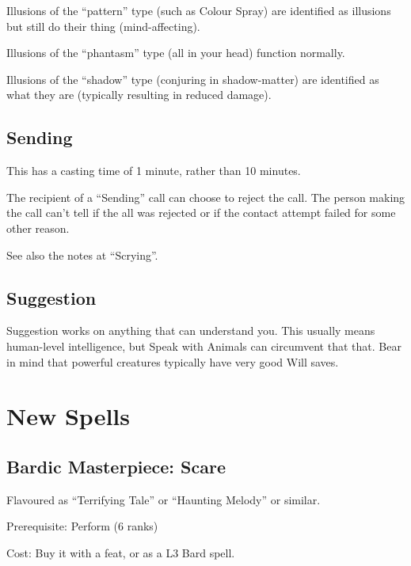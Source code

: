 Illusions of the ``pattern'' type (such as Colour Spray) are identified as
illusions but still do their thing (mind-affecting).

Illusions of the ``phantasm'' type (all in your head) function normally.

Illusions of the ``shadow'' type (conjuring in shadow-matter) are
identified as what they are (typically resulting in reduced damage).
%

%
\subsection{Sending}

This has a casting time of 1 minute, rather than 10 minutes.

The recipient of a ``Sending'' call can choose to reject the call. The
person making the call can't tell if the all was rejected or if the
contact attempt failed for some other reason.

See also the notes at ``Scrying''.
%

%
\subsection{Suggestion}

Suggestion works on anything that can understand you. This usually means
human-level intelligence, but Speak with Animals can circumvent that that.
Bear in mind that powerful creatures typically have very good Will saves.
%

%
%
\section{New Spells}


%
\subsection{Bardic Masterpiece: Scare}

Flavoured as ``Terrifying Tale'' or ``Haunting Melody'' or similar.

Prerequisite: Perform (6 ranks)

Cost: Buy it with a feat, or as a L3 Bard spell.

